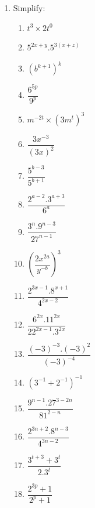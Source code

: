 \begin{eocexercises}{}
\begin{enumerate}[label=\textbf{\arabic*}., itemsep=5pt]
\item Simplify:
\begin{multicols}{2}
\begin{enumerate}[label=\textbf{(\alph*)}, itemsep=7pt]
\item $ t^3 \times 2t^0 $
\item $ 5^{2x+y} . 5^{3(x+z)} $
\item $ (b^{k+1})^k $
\item $ \dfrac{6^{5p}}{9^p} $
\item $ m^{-2t} \times (3m^t)^3 $
\item $\dfrac{3{x}^{-3}}{{(3x)}^{2}}$
\item $\dfrac{{5}^{b-3}}{{5}^{b+1}}$
\item $\dfrac{{2}^{a-2}.{3}^{a+3}}{{6}^{a}}$
\item $\dfrac{{3}^{n}  .{9}^{n-3}}{{27}^{n-1}}$
\item ${(\dfrac{2{x}^{2a}}{{y}^{-b}})}^{3}$
\item $\dfrac{{2}^{3x-1}  .{8}^{x+1}}{{4}^{2x-2}}$
\item $\dfrac{{6}^{2x}  .{11}^{2x}}{{22}^{2x-1}  .{3}^{2x}}$
\item $\dfrac{{(-3)}^{-3}  .{(-3)}^{2}}{{(-3)}^{-4}}$
\item ${({3}^{-1}+{2}^{-1})}^{-1}$
\item $\dfrac{{9}^{n-1}  .{27}^{3-2n}}{{81}^{2-n}}$
\item $\dfrac{{2}^{3n+2}  .{8}^{n-3}}{{4}^{3n-2}}$
\item $\dfrac{3^{t+3} + 3^t}{2 . 3^t} $
\item $\dfrac{2^{3p} +1}{2^p + 1} $
\end{enumerate}
\end{multicols}



\end{enumerate}
\end{eocexercises}
